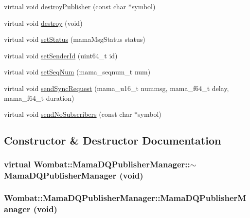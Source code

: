 \begin{DoxyCompactItemize}
\item 
virtual void \hyperlink{classWombat_1_1MamaDQPublisherManager_a7cb1d16699d59c1f368a62c0c0464aa9}{destroyPublisher} (const char $\ast$symbol)
\item 
virtual void \hyperlink{classWombat_1_1MamaDQPublisherManager_a9a3a14de121b17f2dc033355a458b8ef}{destroy} (void)
\item 
virtual void \hyperlink{classWombat_1_1MamaDQPublisherManager_acc4aeb1b255c40f4b91fd43033fac47f}{setStatus} (mamaMsgStatus status)
\item 
virtual void \hyperlink{classWombat_1_1MamaDQPublisherManager_a884251f60c33ff386a816ee9178eceb2}{setSenderId} (uint64\_\-t id)
\item 
virtual void \hyperlink{classWombat_1_1MamaDQPublisherManager_a6f10b19c4e6243f07c5a6430120d84f8}{setSeqNum} (mama\_\-seqnum\_\-t num)
\item 
virtual void \hyperlink{classWombat_1_1MamaDQPublisherManager_af45062d3a82dfea51715eb5c49cff2b2}{sendSyncRequest} (mama\_\-u16\_\-t nummsg, mama\_\-f64\_\-t delay, mama\_\-f64\_\-t duration)
\item 
virtual void \hyperlink{classWombat_1_1MamaDQPublisherManager_a79c5143b738d1c377b75476a8f64c3ed}{sendNoSubscribers} (const char $\ast$symbol)
\end{DoxyCompactItemize}


\subsection{Constructor \& Destructor Documentation}
\hypertarget{classWombat_1_1MamaDQPublisherManager_a539ac8604357815413cb39fe5b584851}{
\subsubsection[{$\sim$MamaDQPublisherManager}]{\setlength{\rightskip}{0pt plus 5cm}virtual Wombat::MamaDQPublisherManager::$\sim$MamaDQPublisherManager (void)}}
\label{classWombat_1_1MamaDQPublisherManager_a539ac8604357815413cb39fe5b584851}
\hypertarget{classWombat_1_1MamaDQPublisherManager_a4c064265c256a1820951fecd676a6377}{
\subsubsection[{MamaDQPublisherManager}]{\setlength{\rightskip}{0pt plus 5cm}Wombat::MamaDQPublisherManager::MamaDQPublisherManager (void)}}
\label{classWombat_1_1MamaDQPublisherManager_a4c064265c256a1820951fecd676a6377}


